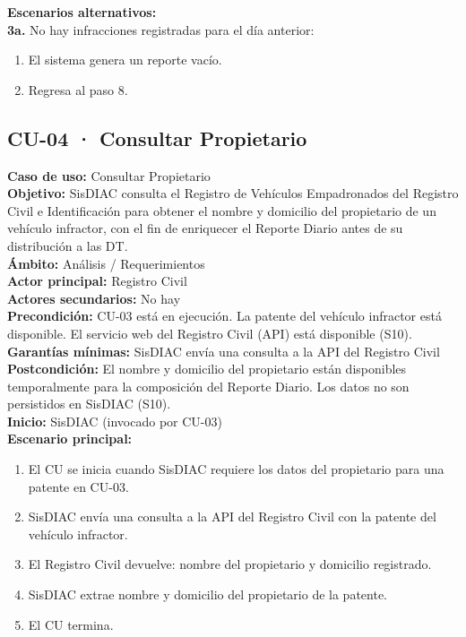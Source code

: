 \documentclass[12pt,letterpaper]{article}
\begin{document}
\noindent \textbf{Escenarios alternativos:} \\
\textbf{3a.} No hay infracciones registradas para el día anterior:
\begin{enumerate}[nosep]
	\item[3a1.] El sistema genera un reporte vacío.
	\item[3a2.] Regresa al paso 8.
\end{enumerate}

\newpage
\subsection{CU-04 · Consultar Propietario}

\noindent \textbf{Caso de uso:} Consultar Propietario \\
\textbf{Objetivo:} SisDIAC consulta el Registro de Vehículos Empadronados del Registro Civil e Identificación para obtener el nombre y domicilio del propietario de un vehículo infractor, con el fin de enriquecer el Reporte Diario antes de su distribución a las DT. \\
\textbf{Ámbito:} Análisis / Requerimientos \\
\textbf{Actor principal:} Registro Civil \\
\textbf{Actores secundarios:} No hay \\
\textbf{Precondición:} CU-03 está en ejecución. La patente del vehículo infractor está disponible. El servicio web del Registro Civil (API) está disponible (S10). \\
\textbf{Garantías mínimas:} SisDIAC envía una consulta a la API del Registro Civil \\
\textbf{Postcondición:} El nombre y domicilio del propietario están disponibles temporalmente para la composición del Reporte Diario. Los datos no son persistidos en SisDIAC (S10). \\
\textbf{Inicio:} SisDIAC (invocado por CU-03) \\

\noindent \textbf{Escenario principal:}
\begin{enumerate}[nosep, leftmargin=*]
	\item El CU se inicia cuando SisDIAC requiere los datos del propietario para una patente en CU-03.
	\item SisDIAC envía una consulta a la API del Registro Civil con la patente del vehículo infractor.
	\item El Registro Civil devuelve: nombre del propietario y domicilio registrado.
	\item SisDIAC extrae nombre y domicilio del propietario de la patente.
	\item El CU termina.
\end{enumerate}
\end{document}
